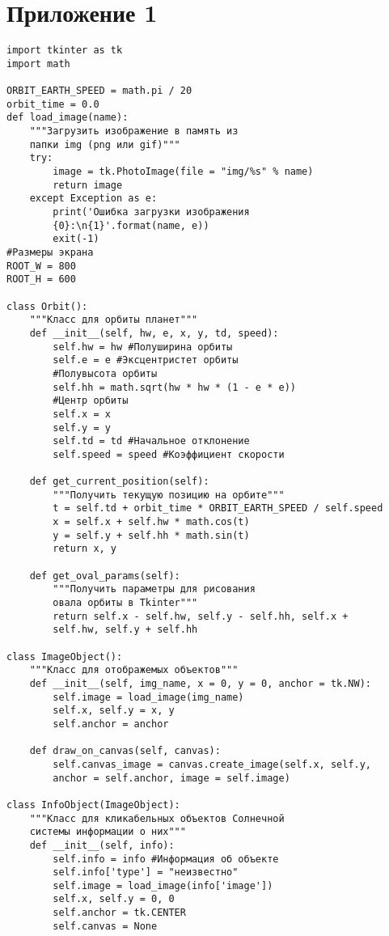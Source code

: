 \documentclass[a4paper,14pt]{extarticle}
\begin{document}
\newpage\section*{Приложение 1} 
\begin{verbatim}
import tkinter as tk
import math

ORBIT_EARTH_SPEED = math.pi / 20
orbit_time = 0.0
def load_image(name):
    """Загрузить изображение в память из
    папки img (png или gif)"""
    try:
        image = tk.PhotoImage(file = "img/%s" % name)
        return image
    except Exception as e:
        print('Ошибка загрузки изображения 
        {0}:\n{1}'.format(name, e))
        exit(-1)
#Размеры экрана
ROOT_W = 800
ROOT_H = 600

class Orbit():
    """Класс для орбиты планет"""
    def __init__(self, hw, e, x, y, td, speed):
        self.hw = hw #Полуширина орбиты
        self.e = e #Эксцентристет орбиты
        #Полувысота орбиты
        self.hh = math.sqrt(hw * hw * (1 - e * e)) 
        #Центр орбиты
        self.x = x
        self.y = y
        self.td = td #Начальное отклонение
        self.speed = speed #Коэффициент скорости
    
    def get_current_position(self):
        """Получить текущую позицию на орбите"""
        t = self.td + orbit_time * ORBIT_EARTH_SPEED / self.speed
        x = self.x + self.hw * math.cos(t)
        y = self.y + self.hh * math.sin(t)
        return x, y
    
    def get_oval_params(self):
        """Получить параметры для рисования
        овала орбиты в Tkinter"""
        return self.x - self.hw, self.y - self.hh, self.x + 
        self.hw, self.y + self.hh

class ImageObject():
    """Класс для отображемых объектов"""
    def __init__(self, img_name, x = 0, y = 0, anchor = tk.NW):
        self.image = load_image(img_name)
        self.x, self.y = x, y
        self.anchor = anchor
    
    def draw_on_canvas(self, canvas):
        self.canvas_image = canvas.create_image(self.x, self.y, 
        anchor = self.anchor, image = self.image)

class InfoObject(ImageObject):
    """Класс для кликабельных объектов Солнечной
    системы информации о них"""
    def __init__(self, info):
        self.info = info #Информация об объекте
        self.info['type'] = "неизвестно"
        self.image = load_image(info['image'])
        self.x, self.y = 0, 0
        self.anchor = tk.CENTER
        self.canvas = None


\end{verbatim}
\end{document}
